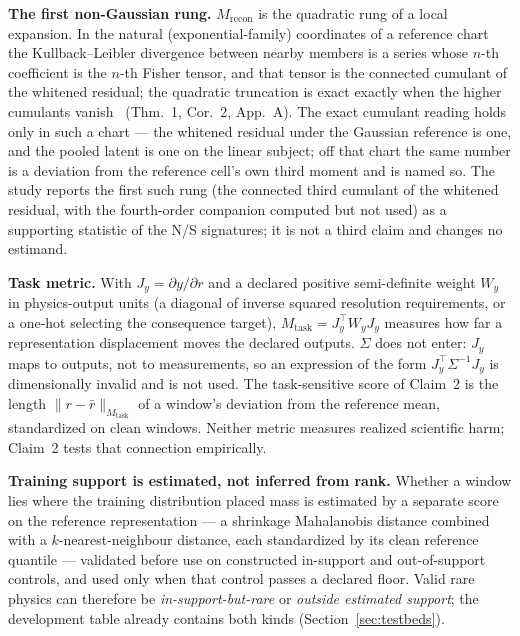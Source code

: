 \documentclass[10pt,twocolumn]{extarticle}
\begin{document}
\textbf{The first non-Gaussian rung.} $M_{\mathrm{recon}}$ is the quadratic rung
of a local expansion. In the natural (exponential-family) coordinates of a
reference chart the Kullback--Leibler divergence between nearby members is a
series whose $n$-th coefficient is the $n$-th Fisher tensor, and that tensor is
the connected cumulant of the whitened residual; the quadratic truncation is
exact exactly when the higher cumulants vanish~\cite{bal2026triality}
(Thm.~1, Cor.~2, App.~A). The exact cumulant reading holds only in such a
chart --- the whitened residual under the Gaussian reference is one, and the
pooled latent is one on the linear subject; off that chart the same number is a
deviation from the reference cell's own third moment and is named so. The study
reports the first such rung (the connected third cumulant of the whitened
residual, with the fourth-order companion computed but not used) as a supporting
statistic of the N/S signatures; it is not a third claim and changes no
estimand.

\textbf{Task metric.} With $J_y=\partial y/\partial r$ and a declared
positive semi-definite weight $W_y$ in physics-output units (a diagonal of
inverse squared resolution requirements, or a one-hot selecting the
consequence target), $M_{\mathrm{task}}=J_y^{\top}W_yJ_y$ measures how far a
representation displacement moves the declared outputs. $\Sigma$ does not
enter: $J_y$ maps to outputs, not to measurements, so an expression of the
form $J_y^{\top}\Sigma^{-1}J_y$ is dimensionally invalid and is not used.
The task-sensitive score of Claim~2 is the length
$\|r-\bar r\|_{M_{\mathrm{task}}}$ of a window's deviation from the reference
mean, standardized on clean windows. Neither metric measures realized
scientific harm; Claim~2 tests that connection empirically.

\textbf{Training support is estimated, not inferred from rank.} Whether a
window lies where the training distribution placed mass is estimated by a
separate score on the reference representation --- a shrinkage Mahalanobis
distance combined with a $k$-nearest-neighbour distance, each standardized by
its clean reference quantile --- validated before use on constructed
in-support and out-of-support controls, and used only when that control
passes a declared floor. Valid rare physics can therefore be
\emph{in-support-but-rare} or \emph{outside estimated support}; the
development table already contains both kinds (Section~\ref{sec:testbeds}).
\end{document}
